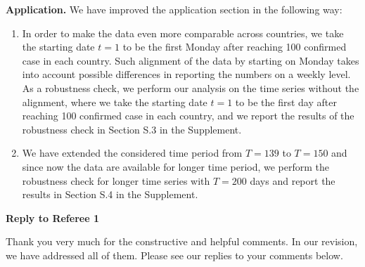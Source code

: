 \documentclass[a4paper,12pt]{article}
\begin{document}
\textbf{Application.} We have improved the application section in the following way:
\begin{enumerate}[label=(\roman*), leftmargin=0.8cm]

\item In order to make the data even more comparable across countries, we take the starting date $t = 1$ to be the first Monday after reaching 100 confirmed case in each country. Such alignment of the data by starting on Monday takes into account possible differences in reporting the numbers on a weekly level. As a robustness check, we perform our analysis on the time series without the alignment, where we take the starting date $t = 1$ to be the first day after reaching 100 confirmed case in each country, and we report the results of the robustness check in Section S.3 in the Supplement.
\item We have extended the considered time period from $T = 139$ to $T = 150$ and since now the data are available for longer time period, we perform the robustness check for longer time series with $T = 200$ days and report the results in Section S.4 in the Supplement.
\end{enumerate}
 
\newpage
\begin{center}
{\large \bf Reply to Referee 1} 
\end{center}


Thank you very much for the constructive and helpful comments. In our revision, we have addressed all of them. Please see our replies to your comments below.
\end{document}
